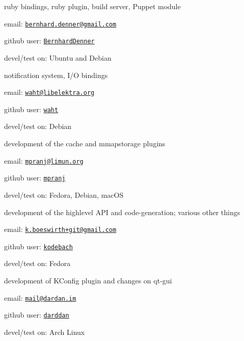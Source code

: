 ruby bindings, ruby plugin, build server, Puppet module


\begin{DoxyItemize}
\item email\+: \href{mailto:bernhard.denner@gmail.com}{\tt bernhard.\+denner@gmail.\+com}
\item github user\+: \href{https://github.com/BernhardDenner}{\tt Bernhard\+Denner}
\item devel/test on\+: Ubuntu and Debian
\end{DoxyItemize}

notification system, I/O bindings


\begin{DoxyItemize}
\item email\+: \href{mailto:waht@libelektra.org}{\tt waht@libelektra.\+org}
\item github user\+: \href{https://github.com/waht}{\tt waht}
\item devel/test on\+: Debian
\end{DoxyItemize}

development of the cache and mmapstorage plugins


\begin{DoxyItemize}
\item email\+: \href{mailto:mpranj@limun.org}{\tt mpranj@limun.\+org}
\item github user\+: \href{https://github.com/mpranj}{\tt mpranj}
\item devel/test on\+: Fedora, Debian, mac\+OS
\end{DoxyItemize}

development of the highlevel A\+PI and code-\/generation; various other things


\begin{DoxyItemize}
\item email\+: \href{mailto:k.boeswirth+git@gmail.com}{\tt k.\+boeswirth+git@gmail.\+com}
\item github user\+: \href{https://github.com/kodebach}{\tt kodebach}
\item devel/test on\+: Fedora
\end{DoxyItemize}

development of K\+Config plugin and changes on qt-\/gui


\begin{DoxyItemize}
\item email\+: \href{mailto:mail@dardan.im}{\tt mail@dardan.\+im}
\item github user\+: \href{https://github.com/darddan}{\tt darddan}
\item devel/test on\+: Arch Linux 
\end{DoxyItemize}